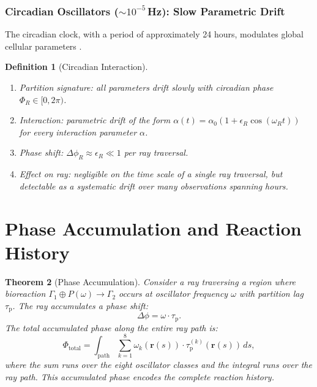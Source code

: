 \documentclass[11pt,twocolumn,a4paper]{article}
\newtheorem{theorem}{Theorem}[section]
\newtheorem{definition}[theorem]{Definition}
\newcommand{\taup}{\tau_{\mathrm{p}}}
\begin{document}
\subsubsection{Circadian Oscillators ($\sim\!10^{-5}$\,Hz):
Slow Parametric Drift}

The circadian clock, with a period of approximately 24 hours,
modulates global cellular parameters \citep{reppert2002}.

\begin{definition}[Circadian Interaction]
\label{def:circadian-interaction}
\begin{enumerate}[label=(\alph*),leftmargin=*]
\item \textit{Partition signature:} all parameters drift slowly with
  circadian phase $\Phi_R \in [0, 2\pi)$.
\item \textit{Interaction:} parametric drift of the form
  $\alpha(t) = \alpha_0(1 + \epsilon_R \cos(\omega_R t))$ for every
  interaction parameter $\alpha$.
\item \textit{Phase shift:} $\Delta\phi_R \approx \epsilon_R \ll 1$
  per ray traversal.
\item \textit{Effect on ray:} negligible on the time scale of a single
  ray traversal, but detectable as a systematic drift over many
  observations spanning hours.
\end{enumerate}
\end{definition}



\section{Phase Accumulation and Reaction History}
\label{sec:phase-accumulation}

\begin{theorem}[Phase Accumulation]
\label{thm:phase-accumulation}
Consider a ray traversing a region where bioreaction
$\Gamma_1 \oplus P(\omega) \to \Gamma_2$ occurs at oscillator
frequency $\omega$ with partition lag $\taup$. The ray accumulates
a phase shift:
\begin{equation}
\Delta\phi = \omega \cdot \taup.
\label{eq:phase-shift}
\end{equation}
The total accumulated phase along the entire ray path is:
\begin{equation}
\Phi_{\mathrm{total}} = \int_{\mathrm{path}} \sum_{k=1}^{8}
  \omega_k(\mathbf{r}(s)) \cdot \taup^{(k)}(\mathbf{r}(s)) \, ds,
\label{eq:total-phase}
\end{equation}
where the sum runs over the eight oscillator classes and the integral
runs over the ray path. This accumulated phase encodes the complete
reaction history.
\end{theorem}
\end{document}
